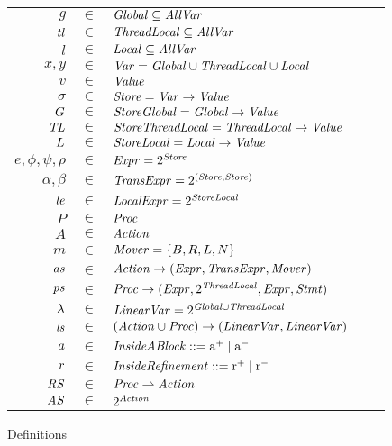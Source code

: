 \begin{figure}
\setlength{\tabcolsep}{3pt}
\begin{tabular}{rclcl}
$g$ & $\in$ & $\mathit{Global} \subseteq \mathit{AllVar}$ \\
$\mathit{tl}$ & $\in$ & $\mathit{ThreadLocal} \subseteq \mathit{AllVar}$ \\
$l$ & $\in$ & $\mathit{Local} \subseteq \mathit{AllVar}$ \\
$x,y$ & $\in$ & $\mathit{Var} = \mathit{Global} \cup \mathit{ThreadLocal} \cup \mathit{Local}$ \\
$v$ &  $\in$ & $\mathit{Value}$ \\
$\sigma$ & $\in$ & $\mathit{Store} = \mathit{Var} \rightarrow \mathit{Value}$ \\
$G$ & $\in$ & $\mathit{StoreGlobal} = \mathit{Global} \rightarrow \mathit{Value}$ \\
$\mathit{TL}$ & $\in$ & $\mathit{StoreThreadLocal} = \mathit{ThreadLocal}  \rightarrow \mathit{Value}$ \\
$L$ & $\in$ & $\mathit{StoreLocal} = \mathit{Local} \rightarrow \mathit{Value}$ \\
$e, \phi, \psi, \rho$ & $\in$ & $\mathit{Expr} = 2^{\mathit{Store}}$ \\
$\alpha, \beta$ & $\in$ & $\mathit{TransExpr} = 2^{(\mathit{Store},\mathit{Store})}$ \\
$\mathit{le}$ & $\in$ & $\mathit{LocalExpr} = 2^{\mathit{StoreLocal}}$ \\
$P$ & $\in$ & $\mathit{Proc}$ \\
$A$ & $\in$ & $\mathit{Action}$ \\
$m$ & $\in$ & $\mathit{Mover} = \{B,R,L,N\}$\\
$\mathit{as}$ & $\in$ & $\mathit{Action} \rightarrow (\mathit{Expr}, \mathit{TransExpr}, \mathit{Mover})$ \\
$\mathit{ps}$ & $\in$ & $\mathit{Proc} \rightarrow (\mathit{Expr}, 2^{\mathit{ThreadLocal}}, \mathit{Expr}, \mathit{Stmt})$ \\
$\lambda$ & $\in$ & $\mathit{LinearVar} = 2^{\mathit{Global} \cup \mathit{ThreadLocal}}$ \\
$\mathit{ls}$ & $\in$ & $(\mathit{Action} \cup \mathit{Proc}) \rightarrow (\mathit{LinearVar}, \mathit{LinearVar})$ \\
$a$ & $\in$ & $\mathit{InsideABlock} ::= \mathrm{a^+} \mid \mathrm{a^-}$ \\
$r$ & $\in$ & $\mathit{InsideRefinement} ::= \mathrm{r^+} \mid \mathrm{r^-}$ \\
$\mathit{RS}$ & $\in$ & $\mathit{Proc} \rightharpoonup \mathit{Action}$ \\
$\mathit{AS}$ & $\in$ & $2^{\mathit{Action}}$ 
\end{tabular}
\caption{Definitions}
\label{fig:definitions}
\end{figure}

